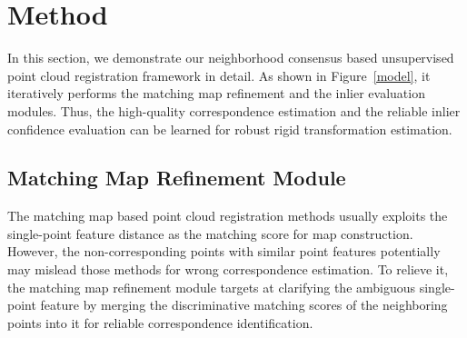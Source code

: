 \documentclass[letterpaper]{article} %
\begin{document}
	
	\section{Method}%
	In this section, we demonstrate our neighborhood consensus based unsupervised point cloud registration framework in detail.
	As shown in Figure~\ref{model}, it iteratively performs the matching map refinement and the inlier evaluation modules. Thus, the high-quality correspondence estimation and the reliable inlier confidence evaluation can be learned for robust rigid transformation estimation. 
	
	\subsection{Matching Map Refinement Module}\label{matching} %
	\label{refine}
	The matching map based point cloud registration methods \cite{yew2020rpm} usually exploits the single-point feature distance as the matching score for map construction. However, the non-corresponding points with similar point features potentially may mislead those methods for wrong correspondence estimation. To relieve it, the matching map refinement module targets at clarifying the ambiguous single-point feature by merging the discriminative matching scores of the neighboring points into it for reliable correspondence identification. 
	
\end{document}
